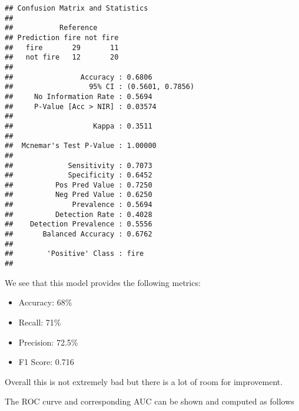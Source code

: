 \documentclass[
]{article}
\newenvironment{Shaded}{\begin{snugshade}}{\end{snugshade}}
\newcommand{\AttributeTok}[1]{\textcolor[rgb]{0.13,0.29,0.53}{#1}}
\newcommand{\ConstantTok}[1]{\textcolor[rgb]{0.56,0.35,0.01}{#1}}
\newcommand{\DecValTok}[1]{\textcolor[rgb]{0.00,0.00,0.81}{#1}}
\newcommand{\FunctionTok}[1]{\textcolor[rgb]{0.13,0.29,0.53}{\textbf{#1}}}
\newcommand{\NormalTok}[1]{#1}
\newcommand{\OtherTok}[1]{\textcolor[rgb]{0.56,0.35,0.01}{#1}}
\newcommand{\SpecialCharTok}[1]{\textcolor[rgb]{0.81,0.36,0.00}{\textbf{#1}}}
\newcommand{\StringTok}[1]{\textcolor[rgb]{0.31,0.60,0.02}{#1}}
\begin{document}
\begin{verbatim}
## Confusion Matrix and Statistics
## 
##           Reference
## Prediction fire not fire
##   fire       29       11
##   not fire   12       20
##                                           
##                Accuracy : 0.6806          
##                  95% CI : (0.5601, 0.7856)
##     No Information Rate : 0.5694          
##     P-Value [Acc > NIR] : 0.03574         
##                                           
##                   Kappa : 0.3511          
##                                           
##  Mcnemar's Test P-Value : 1.00000         
##                                           
##             Sensitivity : 0.7073          
##             Specificity : 0.6452          
##          Pos Pred Value : 0.7250          
##          Neg Pred Value : 0.6250          
##              Prevalence : 0.5694          
##          Detection Rate : 0.4028          
##    Detection Prevalence : 0.5556          
##       Balanced Accuracy : 0.6762          
##                                           
##        'Positive' Class : fire            
## 
\end{verbatim}

We see that this model provides the following metrics:

\begin{itemize}
\item
  Accuracy: 68\%
\item
  Recall: 71\%
\item
  Precision: 72.5\%
\item
  F1 Score: 0.716
\end{itemize}

Overall this is not extremely bad but there is a lot of room for
improvement.

The ROC curve and corresponding AUC can be shown and computed as follows

\begin{Shaded}
\end{Shaded}
\end{document}

